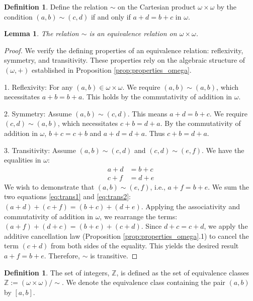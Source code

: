\documentclass[11pt, a4paper]{article}
\theoremstyle{plain}
\newtheorem{lemma}[theorem]{Lemma}
\theoremstyle{definition}
\newtheorem{definition}[theorem]{Definition}
\numberwithin{equation}{section}
\newcommand{\Z}{\mathbb{Z}}
\begin{document}
\begin{definition}
Define the relation $\sim$ on the Cartesian product $\omega \times \omega$ by the condition $(a, b) \sim (c, d)$ if and only if $a+d = b+c$ in $\omega$.
\end{definition}

\begin{lemma}\label{lem:Z_equivalence_relation}
The relation $\sim$ is an equivalence relation on $\omega \times \omega$.
\end{lemma}
\begin{proof}
We verify the defining properties of an equivalence relation: reflexivity, symmetry, and transitivity. These properties rely on the algebraic structure of $(\omega, +)$ established in Proposition \ref{prop:properties_omega}.

1. Reflexivity: For any $(a, b) \in \omega \times \omega$. We require $(a, b) \sim (a, b)$, which necessitates $a+b = b+a$. This holds by the commutativity of addition in $\omega$.

2. Symmetry: Assume $(a, b) \sim (c, d)$. This means $a+d = b+c$. We require $(c, d) \sim (a, b)$, which necessitates $c+b = d+a$. By the commutativity of addition in $\omega$, $b+c=c+b$ and $a+d=d+a$. Thus $c+b = d+a$.

3. Transitivity: Assume $(a, b) \sim (c, d)$ and $(c, d) \sim (e, f)$. We have the equalities in $\omega$:
\begin{align}
    a+d &= b+c \label{eq:trans1} \\
    c+f &= d+e \label{eq:trans2}
\end{align}
We wish to demonstrate that $(a, b) \sim (e, f)$, i.e., $a+f = b+e$.
We sum the two equations \eqref{eq:trans1} and \eqref{eq:trans2}:
$(a+d) + (c+f) = (b+c) + (d+e)$.
Applying the associativity and commutativity of addition in $\omega$, we rearrange the terms:
$(a+f) + (d+c) = (b+e) + (c+d)$.
Since $d+c=c+d$, we apply the additive cancellation law (Proposition \ref{prop:properties_omega}.1) to cancel the term $(c+d)$ from both sides of the equality. This yields the desired result $a+f = b+e$.
Therefore, $\sim$ is transitive.
\end{proof}

\begin{definition}
The set of integers, $\Z$, is defined as the set of equivalence classes $\Z := (\omega \times \omega) / \sim$. We denote the equivalence class containing the pair $(a, b)$ by $[a, b]$.
\end{definition}
\end{document}
